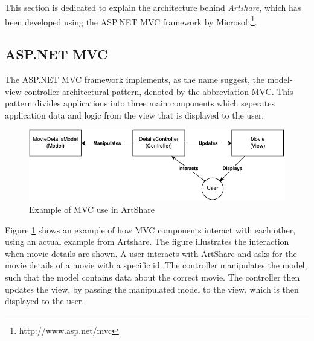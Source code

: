 \documentclass[../report.tex]{subfiles}
\begin{document}
\graphicspath{{img/}{../img/}}

This section is dedicated to explain the architecture behind \textit{Artshare}, which has been developed using the ASP.NET MVC framework by Microsoft\footnote{http://www.asp.net/mvc}. 


\subsection{ASP.NET MVC}

The ASP.NET MVC framework implements, as the name suggest, the model-view-controller architectural pattern, denoted by the abbreviation MVC. This pattern divides applications into three main components which seperates application data and logic from the view that is displayed to the user. 


\begin{figure}[H]
\includegraphics[width=\linewidth]{mvc.pdf}
\caption{Example of MVC use in ArtShare}
\label{fig:mvc}
\end{figure}

Figure \ref{fig:mvc} shows an example of how MVC components interact with each other, using an actual example from Artshare. The figure illustrates the interaction when movie details are shown. A user interacts with ArtShare and asks for the movie details of a movie with a specific id. The controller manipulates the model, such that the model contains data about the correct movie. The controller then updates the view, by passing the manipulated model to the view, which is then displayed to the user.
\end{document}
